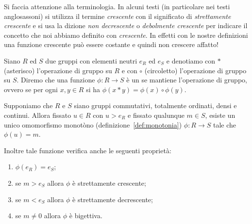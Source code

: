   Si faccia attenzione alla terminologia.
  In alcuni testi (in particolare nei testi anglosassoni) si utilizza il termine
  \emph{crescente} con il significato di \emph{strettamente crescente} 
  e si usa la dizione \emph{non decrescente} o \emph{debolmente crescente} 
  per indicare il concetto che noi abbiamo definito con \emph{crescente}. 
  In effetti con le nostre definizioni una funzione crescente può essere costante
  e quindi non crescere affatto!

\begin{theorem}
\label{th:isomorfismo}%
Siano $R$ ed $S$ due gruppi
con elementi neutri $e_R$ ed $e_S$ e denotiamo con $*$ (asterisco) l'operazione di gruppo su $R$ 
e con $\circ$ (circoletto) l'operazione di gruppo su $S$.
Diremo che una funzione $\phi\colon R\to S$ è un 
se mantiene l'operazione di gruppo, ovvero se per ogni $x,y\in R$ 
si ha $\phi(x*y) = \phi(x)\circ \phi(y)$.

Supponiamo che $R$ e $S$ siano gruppi commutativi, totalmente ordinati, densi e continui.
Allora fissato $u\in R$ con $u > e_R$ e fissato qualunque $m \in S$, 
esiste un unico omomorfismo monotòno (definizione~\ref{def:monotonia})
$\phi\colon R \to S$ tale che $\phi(u)=m$.

Inoltre tale funzione verifica anche le seguenti proprietà:
\begin{enumerate}
  \item $\phi(e_R) = e_S$;
  \item se $m>e_S$ allora $\phi$ è strettamente crescente;
  \item se $m<e_S$ allora $\phi$ è strettamente decrescente;
  \item se $m\neq 0$ allora $\phi$ è bigettiva.
\end{enumerate}
\end{theorem}

